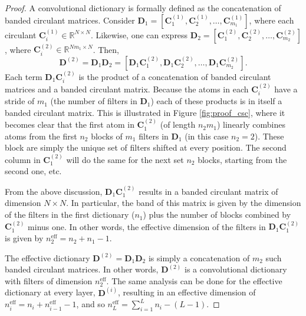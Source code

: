 \documentclass[10pt,journal]{IEEEtran}
\def\D{{\mathbf D}}
\def\C{{\mathbf C}}
\theoremstyle{plain}
\theoremstyle{definition}
\begin{document}
\begin{proof} 
	A convolutional dictionary is formally defined as the concatenation of banded circulant matrices. Consider $\D_1 = \left[ \C^{(1)}_1, \C^{(1)}_2, \dots, \C^{(1)}_{m_1}\right]$, where each circulant $\C^{(1)}_i \in \mathbb{R}^{N\times N}$. Likewise, one can express $\D_2 = \left[ \C^{(2)}_1, \C^{(2)}_2, \dots, \C^{(2)}_{m_2}\right]$, where $\C^{(2)}_i \in \mathbb{R}^{Nm_1\times N}$. Then,
	\begin{equation}
	\D^{(2)} = \D_1\D_2 = \left[ \D_1 \C^{(2)}_1, \D_1\C^{(2)}_2, \dots, \D_1\C^{(2)}_{m_2}\right].
	\end{equation}
	Each term $\D_1\C^{(2)}_i$ is the product of a concatenation of banded circulant matrices and a banded circulant matrix. Because the atoms in each $\C^{(2)}_i$ have a stride of $m_1$ (the number of filters in $\D_1$) each of these products is in itself a banded circulant matrix. This is illustrated in Figure \ref{fig:proof_csc}, where it becomes clear that the first atom in $\C^{(2)}_1$ (of length $n_2m_1$) linearly combines atoms from the first $n_2$ blocks of $m_1$ filters in $\D_1$ (in this case $n_2 = 2$). These block are simply the unique set of filters shifted at every position. The second column in $\C^{(2)}_1$ will do the same for the next set $n_2$ blocks, starting from the second one, etc. 
	
	From the above discussion, $\D_1\C^{(2)}_1$ results in a banded circulant matrix of dimension $N\times N$. In particular, the band of this matrix is given by the dimension of the filters in the first dictionary ($n_1$) plus the number of blocks combined by $\C^{(2)}_1$ minus one. In other words, the effective dimension of the filters in $\D_1\C^{(2)}_1$ is given by $n^\text{eff}_2 = n_2+n_1-1$.
	
	The effective dictionary $\D^{(2)} = \D_1\D_2$ is simply a concatenation of $m_2$ such banded circulant matrices. In other words, $\D^{(2)}$ is a convolutional dictionary with filters of dimension $n_2^\text{eff}$. The same analysis can be done for the effective dictionary at every layer, $\D^{(i)}$, resulting in an effective dimension of $n^{\text{eff}}_i = n_i + n^{\text{eff}}_{i-1}-1$, and so $n_L^{\text{eff}} = \sum_{i=1}^{L} n_i - (L-1)$. 
	
	

\end{proof}
\end{document}

